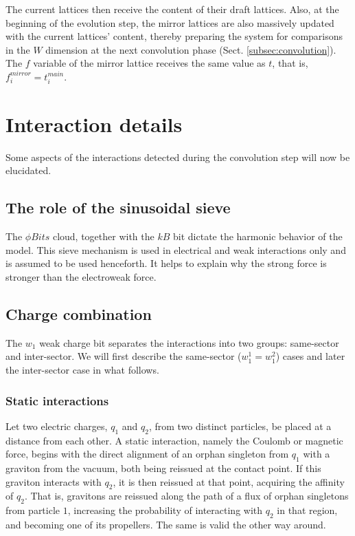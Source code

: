 \documentclass[12pt,english]{article}
\begin{document}
The current lattices then receive the content of their draft lattices. Also, at the beginning of the evolution step, the mirror lattices are also massively updated with the current lattices' content, thereby preparing the system for comparisons in the $W$ dimension at the next convolution phase (Sect. \ref{subsec:convolution}). The $f$ variable of the mirror lattice receives the same value as $t$, that is, $f_i^{mirror}=t_i^{main}$.


\section{Interaction details\label{sec:Interactions}}

Some aspects of the interactions detected during the convolution step will now be elucidated.

\subsection{The role of the sinusoidal sieve}

The $\phi Bits$ cloud, together with the $kB$ bit dictate the harmonic behavior of the model. This sieve mechanism is used in electrical and weak interactions only and is assumed to be used henceforth. It helps to explain why the strong force is stronger than the electroweak force.

\subsection{Charge combination}

The $w_{1}$ weak charge bit separates the interactions into two groups:
same-sector and inter-sector. We will first describe the same-sector ($w_{1}^{1}=w_{1}^{2}$) cases and later the inter-sector case in what follows.

\subsubsection{Static interactions}

Let two electric charges, $q_1$ and $q_2$, from two distinct particles, be placed at a distance from each other. A static interaction, namely the Coulomb or magnetic force, begins with the direct alignment of an orphan singleton from $q_1$ with a graviton from the vacuum, both being reissued at the contact point. If this graviton interacts with $q_2$, it is then reissued at that point, acquiring the affinity of $q_2$. That is, gravitons are reissued along the path of a flux of orphan singletons from particle $1$, increasing the probability of interacting with $q_2$ in that region, and becoming one of its propellers. The same is valid the other way around.
\end{document}
